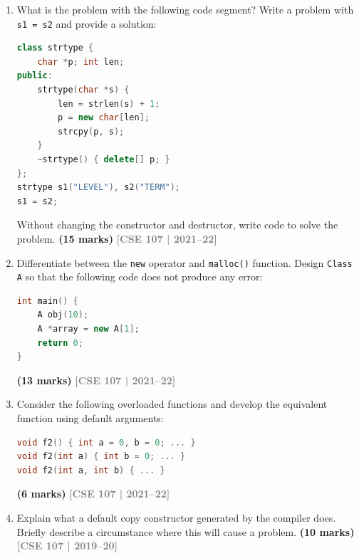 \documentclass[12pt,a3paper]{article}
\newcommand{\yr}[1]{\hfill\textcolor{gray}{\small\textbf{[#1]}}}
\newcommand{\mk}[1]{\textcolor{orange!70!black}{\small\textbf{(#1 marks)}}}
\begin{document}
\begin{enumerate}



\item What is the problem with the following code segment? Write a problem with \texttt{s1 = s2} and provide a solution:
\begin{lstlisting}[language=C++]
class strtype {
    char *p; int len;
public:
    strtype(char *s) {
        len = strlen(s) + 1;
        p = new char[len];
        strcpy(p, s);
    }
    ~strtype() { delete[] p; }
};
strtype s1("LEVEL"), s2("TERM");
s1 = s2;
\end{lstlisting}
Without changing the constructor and destructor, write code to solve the problem. \mk{15}
\yr{CSE 107 | 2021--22}





\item Differentiate between the \texttt{new} operator and \texttt{malloc()} function. Design \texttt{Class A} so that the following code does not produce any error:
\begin{lstlisting}[language=C++]
int main() {
    A obj(10);
    A *array = new A[1];
    return 0;
}
\end{lstlisting}
\mk{13}
\yr{CSE 107 | 2021--22}






\item Consider the following overloaded functions and develop the equivalent function using default arguments:
\begin{lstlisting}[language=C++]
void f2() { int a = 0, b = 0; ... }
void f2(int a) { int b = 0; ... }
void f2(int a, int b) { ... }
\end{lstlisting}
\mk{6}
\yr{CSE 107 | 2021--22}





\item Explain what a default copy constructor generated by the compiler does. Briefly describe a circumstance where this will cause a problem. \mk{10}
\yr{CSE 107 | 2019--20}





\end{enumerate}
\end{document}
